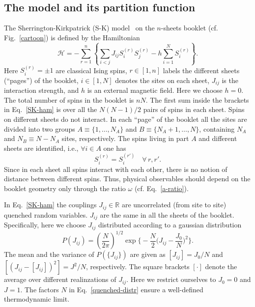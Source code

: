 \documentclass[twocolumn,superscriptaddress,prb,10pt]{revtex4-1}
\begin{document}
\subsection{The model and its partition function}
\label{the-model-def}

The Sherrington-Kirkpatrick (S-K) model~\cite{sherrington-1978-prl,
sherrington-1978} on the $n$-sheets booklet (cf. Fig.~\ref{cartoon}) is 
defined by the Hamiltonian
%
\begin{equation}
{\mathcal H}=-\sum\limits_{r=1}^n\left\{\sum\limits_{i<j}J_{ij}S^{(r)}_i 
S^{(r)}_j-h\sum\limits_{i=1}^NS^{(r)}_i\right\}.
\label{SK-ham}
\end{equation}
%
Here $S_i^{(r)}=\pm 1$ are classical Ising spins, $r\in[1,n]$ labels the 
different sheets (``pages'') of the booklet, $i\in[1,N]$ denotes the sites on 
each sheet, $J_{ij}$ is the interaction strength, and $h$ is an external 
magnetic field. Here we choose $h=0$. The total number of spins in the booklet 
is $nN$. The first sum inside the brackets in Eq.~\eqref{SK-ham} is over all the 
$N(N-1)/2$ pairs of spins in each sheet. Spins on different sheets do not interact. 
In each ``page'' of the booklet all the sites are divided into two groups $A\equiv
\{1,\dots, N_A\}$ and $B\equiv\{N_A+1,\dots,N\}$, containing $N_A$ and $N_B\equiv 
N-N_A$ sites, respectively. The spins living in part $A$ and different sheets 
are identified, i.e., $\forall i\in A$ one has  
%
\begin{equation}
S_i^{(r)}=S_{i}^{(r')}\quad\forall\, r,r'. 
\label{book-constraint}
\end{equation}
%
Since in each sheet all spins interact with each other, there is no notion of distance 
between different spins. Thus, physical observables should depend on the booklet geometry 
only through the ratio $\omega$ (cf. Eq.~\eqref{a-ratio}). 

In Eq.~\eqref{SK-ham} the couplings $J_{ij}\in\mathbb{R}$ are uncorrelated (from site to site) 
quenched random variables. $J_{ij}$ are the same in all the sheets of the booklet. Specifically, 
here we choose $J_{ij}$ distributed according to a gaussian distribution   
%
\begin{equation}
P(J_{ij})=
\left(\frac{N}{2\pi}\right)^{1/2}
\exp\Big\{-\frac{N}{2}
\Big(J_{ij}-\frac{J_0}{N}\Big)^2\Big\}.
\label{quenched-distr}
\end{equation}
%
The mean and the variance of $P(\{J_{ij}\})$ are given as $[J_{ij}]=J_0/N$ 
and $[(J_{ij}-[J_{ij}])^2]=J^2/N$, respectively. The square brackets $[\cdot]$ denote 
the average over different realinzations of $J_{ij}$.  Here we restrict ourselves to 
$J_0=0$ and $J=1$. The factors $N$ in Eq.~\eqref{quenched-distr} ensure a well-defined 
thermodynamic limit. 
\end{document}
